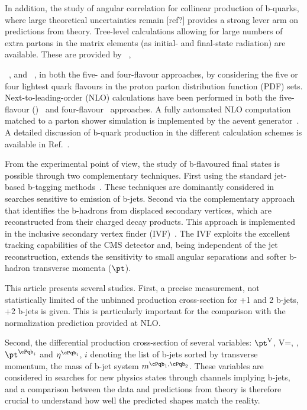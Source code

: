 In addition, the study of angular correlation for collinear production of b-quarks, where large theoretical uncertainties remain [ref?] provides a strong lever arm on predictions from theory. Tree-level calculations allowing for large numbers of extra partons in the matrix elements (as initial- and final-state radiation) are available. These are provided by \MADGRAPH~\cite{Alwall:2007st,Alwall:2011uj}, {\ALPGEN~\cite{alpgen},  and \SHERPA~\cite{Gleisberg:2008ta},
in both the five- and  four-flavour approaches, \ie by considering the five or four lightest quark flavours in the proton parton distribution function (PDF) sets. Next-to-leading-order (NLO) calculations have been performed in both the five-flavour (\MCFM)~\cite{Campbell:2000bg} and four-flavour~\cite{FebresCordero:2008ci,Cordero:2009kv}  approaches. A fully automated NLO computation matched to a parton shower simulation is implemented by the a\MCATNLO event
generator~\cite{Frederix:2011qg,Frixione:2002ik}. A detailed discussion of b-quark production in the different calculation schemes is available in Ref.~\cite{Maltoni:2012pa}.


From the experimental point of view, the study of b-flavoured final states is possible through two complementary techniques. First using the standard jet-based b-tagging methods~\cite{Chatrchyan:2012jua}. These techniques are dominantly considered in searches sensitive to emission of b-jets. Second via the complementary approach that identifies the b-hadrons from displaced secondary vertices, which are reconstructed from their charged decay products. This approach is implemented in the inclusive secondary vertex  finder (IVF)~\cite{Khachatryan:2011wq}. The IVF exploits
the excellent tracking capabilities of the CMS detector and, being independent of the jet reconstruction, extends the sensitivity to small angular separations and softer b-hadron transverse momenta ($\pt$).
  
This article presents several studies. First, a precise measurement, not statistically limited of the unbinned production cross-section for \cPZ+1 and 2 b-jets,  \Wpm+2 b-jets is given. This is particularly important for the comparison with the normalization prediction provided at NLO.  

Second, the differential production cross-section of several variables: $\pt^{\rm V}$, V=\cPZ, \Wpm, $\pt^{\cPqb_i}$ and $\eta^{\cPqb_i}$, $i$ denoting the list of b-jets sorted by transverse momentum, the mass of b-jet system $m^{\cPqb_1,\cPqb_2}$. These variables are considered in searches for new physics states through channels implying b-jets, and a comparison between the data and predictions from theory is therefore crucial to understand how well the predicted shapes match the reality. 

}
